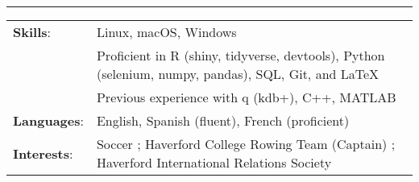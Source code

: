 \documentclass[paper=a4, fontsize=11pt]{scrartcl} %
\begin{document}
\vspace{-3mm}
\rule{\textwidth}{0.4pt}

\vspace{1.5mm}

\begin{tabularx}{\linewidth}{ll}

\hspace{-3mm}

\textbf{Skills}: & Linux, macOS, Windows \\
  & Proficient in R (shiny, tidyverse, devtools), Python (selenium, numpy, pandas), SQL, Git, and \LaTeX \\
  & Previous experience with q (kdb+), C++, MATLAB\\[1mm]

\hspace{-3mm}
\textbf{Languages}: & English, Spanish (fluent), French (proficient) \\
[1mm]



\hspace{-3mm}
\textbf{Interests}: & Soccer ; Haverford College Rowing Team (Captain) ; Haverford International Relations Society \\ [1mm]


\end{tabularx}
\end{document}
